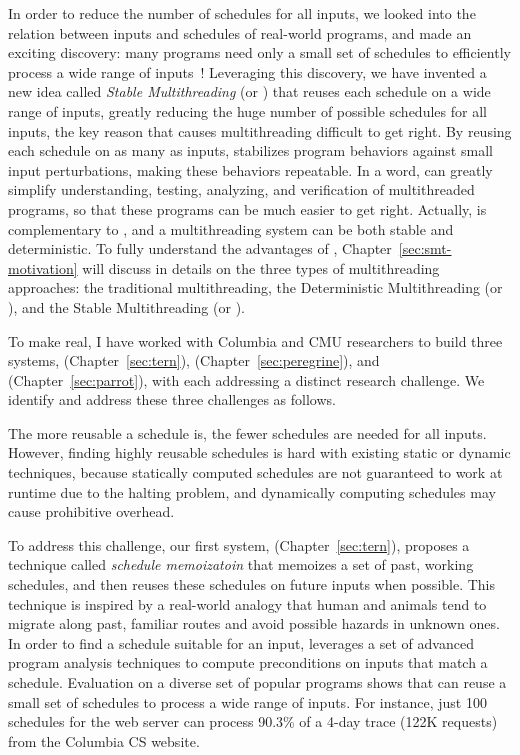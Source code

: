 In order to reduce the number of schedules for all inputs, we looked into the
relation between inputs and schedules of real-world programs, and made an
exciting discovery: many programs need only a small set of schedules to
efficiently process a wide range of inputs~\cite{smt:cacm}! Leveraging this
discovery, we have invented a new idea called \emph{Stable Multithreading} (or 
\emph{\smt}) that reuses each schedule on a wide range of inputs, greatly 
reducing the huge number of possible schedules for all inputs, the key 
reason that causes multithreading difficult to get right. By reusing each 
schedule on as many as inputs, \smt stabilizes program behaviors 
against small input perturbations, making these behaviors repeatable. In a 
word, \smt can greatly simplify understanding, testing, analyzing, and 
verification of multithreaded programs, so that these programs can be much 
easier to get right. Actually, \smt is complementary to \dmt, and a 
multithreading system can be both stable and deterministic. To fully understand 
the advantages of \smt, Chapter~\ref{sec:smt-motivation} will discuss in 
details on the three types of multithreading approaches: the traditional 
multithreading, the Deterministic Multithreading (or \dmt), and the Stable 
Multithreading (or \smt).


To make \smt real, I have worked with Columbia and CMU researchers to build
three \smt systems, \tern (Chapter~\ref{sec:tern}), \peregrine 
(Chapter~\ref{sec:peregrine}), and \parrot (Chapter~\ref{sec:parrot}), with 
each addressing a distinct research challenge. We identify and address these 
three challenges as follows.

 The more reusable a schedule is, the fewer schedules are needed for 
all inputs.
However, finding highly reusable schedules is hard with existing static or
dynamic techniques, because statically computed schedules are not guaranteed to
work at runtime due to the halting problem, and dynamically computing schedules
may cause prohibitive overhead.

To address this challenge, our first \smt system, 
\tern (Chapter~\ref{sec:tern}), proposes a technique 
called \emph{schedule memoizatoin} that memoizes a set of past, working 
schedules, and then reuses these schedules on future inputs when possible. This 
technique is inspired by a real-world analogy that human and animals tend to 
migrate along past, familiar routes and avoid possible hazards in unknown ones. 
In order to find a schedule suitable for an input, \tern leverages a set of 
advanced program analysis techniques to compute preconditions on inputs that 
match a schedule. Evaluation on a diverse set of popular programs shows that 
\tern can reuse a small set of schedules to process a wide range of inputs. For 
instance, just 100 schedules for the \apache web server can process 90.3\% of a 
4-day trace (122K requests) from the Columbia CS website.

